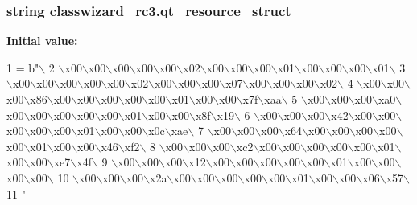 \subsubsection[{qt\+\_\+resource\+\_\+struct}]{\setlength{\rightskip}{0pt plus 5cm}string classwizard\+\_\+rc3.\+qt\+\_\+resource\+\_\+struct}\label{namespaceclasswizard__rc3_a415ed2d679736228906dda1dafdbfa3f}
{\bfseries Initial value\+:}
\begin{DoxyCode}
1 = b\textcolor{stringliteral}{"\(\backslash\)}
2 \textcolor{stringliteral}{\(\backslash\)x00\(\backslash\)x00\(\backslash\)x00\(\backslash\)x00\(\backslash\)x00\(\backslash\)x02\(\backslash\)x00\(\backslash\)x00\(\backslash\)x00\(\backslash\)x01\(\backslash\)x00\(\backslash\)x00\(\backslash\)x00\(\backslash\)x01\(\backslash\)}
3 \textcolor{stringliteral}{\(\backslash\)x00\(\backslash\)x00\(\backslash\)x00\(\backslash\)x00\(\backslash\)x00\(\backslash\)x02\(\backslash\)x00\(\backslash\)x00\(\backslash\)x00\(\backslash\)x07\(\backslash\)x00\(\backslash\)x00\(\backslash\)x00\(\backslash\)x02\(\backslash\)}
4 \textcolor{stringliteral}{\(\backslash\)x00\(\backslash\)x00\(\backslash\)x00\(\backslash\)x86\(\backslash\)x00\(\backslash\)x00\(\backslash\)x00\(\backslash\)x00\(\backslash\)x00\(\backslash\)x01\(\backslash\)x00\(\backslash\)x00\(\backslash\)x7f\(\backslash\)xaa\(\backslash\)}
5 \textcolor{stringliteral}{\(\backslash\)x00\(\backslash\)x00\(\backslash\)x00\(\backslash\)xa0\(\backslash\)x00\(\backslash\)x00\(\backslash\)x00\(\backslash\)x00\(\backslash\)x00\(\backslash\)x01\(\backslash\)x00\(\backslash\)x00\(\backslash\)x8f\(\backslash\)x19\(\backslash\)}
6 \textcolor{stringliteral}{\(\backslash\)x00\(\backslash\)x00\(\backslash\)x00\(\backslash\)x42\(\backslash\)x00\(\backslash\)x00\(\backslash\)x00\(\backslash\)x00\(\backslash\)x00\(\backslash\)x01\(\backslash\)x00\(\backslash\)x00\(\backslash\)x0c\(\backslash\)xae\(\backslash\)}
7 \textcolor{stringliteral}{\(\backslash\)x00\(\backslash\)x00\(\backslash\)x00\(\backslash\)x64\(\backslash\)x00\(\backslash\)x00\(\backslash\)x00\(\backslash\)x00\(\backslash\)x00\(\backslash\)x01\(\backslash\)x00\(\backslash\)x00\(\backslash\)x46\(\backslash\)xf2\(\backslash\)}
8 \textcolor{stringliteral}{\(\backslash\)x00\(\backslash\)x00\(\backslash\)x00\(\backslash\)xc2\(\backslash\)x00\(\backslash\)x00\(\backslash\)x00\(\backslash\)x00\(\backslash\)x00\(\backslash\)x01\(\backslash\)x00\(\backslash\)x00\(\backslash\)xe7\(\backslash\)x4f\(\backslash\)}
9 \textcolor{stringliteral}{\(\backslash\)x00\(\backslash\)x00\(\backslash\)x00\(\backslash\)x12\(\backslash\)x00\(\backslash\)x00\(\backslash\)x00\(\backslash\)x00\(\backslash\)x00\(\backslash\)x01\(\backslash\)x00\(\backslash\)x00\(\backslash\)x00\(\backslash\)x00\(\backslash\)}
10 \textcolor{stringliteral}{\(\backslash\)x00\(\backslash\)x00\(\backslash\)x00\(\backslash\)x2a\(\backslash\)x00\(\backslash\)x00\(\backslash\)x00\(\backslash\)x00\(\backslash\)x00\(\backslash\)x01\(\backslash\)x00\(\backslash\)x00\(\backslash\)x06\(\backslash\)x57\(\backslash\)}
11 \textcolor{stringliteral}{"}
\end{DoxyCode}
